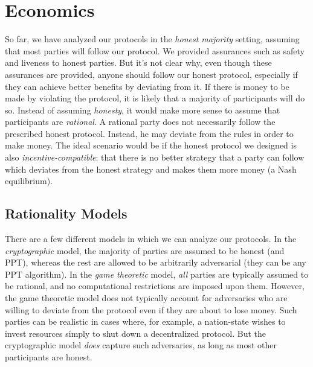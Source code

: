 \chapter{Economics}\label{chapter:economics}

So far, we have analyzed our protocols in the \emph{honest majority} setting,
assuming that most parties will follow our protocol. We provided assurances
such as safety and liveness to honest parties. But it's not clear why,
even though these assurances are provided, anyone should follow our honest
protocol, especially if they can achieve better benefits by deviating from
it. If there is money to be made by violating the protocol, it is likely that
a majority of participants will do so. Instead of assuming \emph{honesty},
it would make more sense to assume that participants are \emph{rational}.
A rational party does not necessarily follow the prescribed honest protocol.
Instead, he may deviate from the rules in order to make money.
The ideal scenario would be if the honest protocol we designed is also
\emph{incentive-compatible}:
that there is no better strategy that
a party can follow which deviates from the honest strategy and makes them
more money (a Nash equilibrium).

\section{Rationality Models}

There are a few different models in which we can analyze our protocols.
In the \emph{cryptographic} model, the majority of parties are assumed
to be honest (and PPT), whereas the rest are allowed to be arbitrarily
adversarial (they can be any PPT algorithm). In the \emph{game theoretic}
model, \emph{all} parties are typically assumed to be rational, and
no computational restrictions are imposed upon them. However, the game
theoretic model does not typically account for adversaries who are willing
to deviate from the protocol even if they are about to lose money. Such
parties can be realistic in cases where, for example, a nation-state
wishes to invest resources simply to shut down a decentralized protocol.
But the cryptographic model \emph{does} capture such adversaries, as
long as most other participants are honest.

